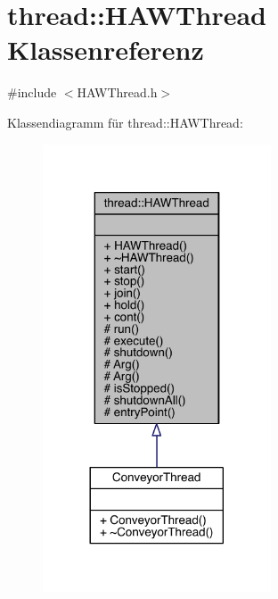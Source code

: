 \hypertarget{classthread_1_1_h_a_w_thread}{}\section{thread\+:\+:H\+A\+W\+Thread Klassenreferenz}
\label{classthread_1_1_h_a_w_thread}


{\ttfamily \#include $<$H\+A\+W\+Thread.\+h$>$}



Klassendiagramm für thread\+:\+:H\+A\+W\+Thread\+:\nopagebreak
\begin{figure}[H]
\begin{center}
\leavevmode
\includegraphics[width=192pt]{classthread_1_1_h_a_w_thread__inherit__graph}
\end{center}
\end{figure}


